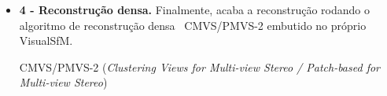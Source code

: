 \begin{itemize}



\item \textbf{4 - Reconstrução densa.} Finalmente, acaba a reconstrução rodando o algoritmo de reconstrução densa~\cite{gavadense} CMVS/PMVS-2 embutido no próprio VisualSfM.

CMVS/PMVS-2 (\emph{Clustering Views for Multi-view Stereo / Patch-based for Multi-view Stereo})



\end{itemize}
